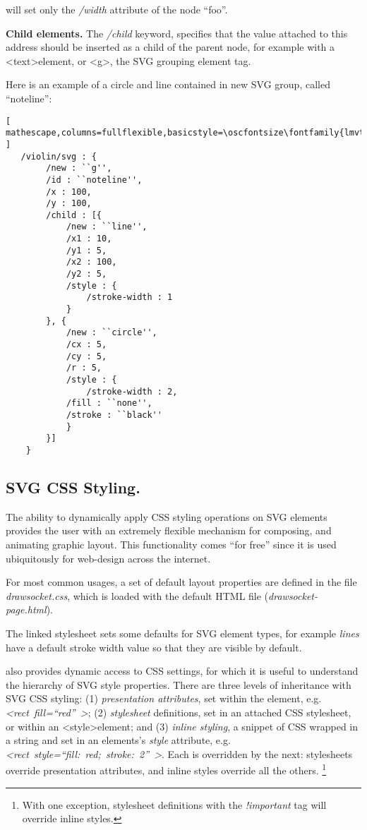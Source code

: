 \noindent
will set only the \textit{/width} attribute of the node ``foo''.

\medskip
\noindent
\textbf{Child elements.} 
The \textit{/child} keyword, specifies that the value attached to this address should be inserted as a child of the parent node, for example with a \textless text\textgreater element, or \textless g\textgreater, the SVG grouping element tag.

Here is an example of a circle and line contained in new SVG group, called ``noteline'':

\begin{lstlisting}[ mathescape,columns=fullflexible,basicstyle=\oscfontsize\fontfamily{lmvtt}\selectfont ]
   /violin/svg : {
        /new : ``g'',
        /id : ``noteline'',
        /x : 100,
        /y : 100,
    	/child : [{
      	    /new : ``line'',
      	    /x1 : 10,
      	    /y1 : 5,
      	    /x2 : 100,
      	    /y2 : 5,
      	    /style : {
      	        /stroke-width : 1
      	    }
      	}, {
      	    /new : ``circle'',
      	    /cx : 5,
      	    /cy : 5,
      	    /r : 5,
      	    /style : {
      	        /stroke-width : 2,
      		/fill : ``none'',
      		/stroke : ``black''
      	    }
        }]
    }
\end{lstlisting}


\subsection{SVG CSS Styling.} 
The ability to dynamically apply CSS styling operations on SVG elements provides the user with an extremely flexible mechanism for composing, and animating graphic layout.
This functionality comes ``for free'' since it is used ubiquitously for web-design across the internet.

For most common \drawsocket usages, a set of default layout properties are defined in the file \textit{drawsocket.css}, which is loaded with the default HTML file (\textit{drawsocket-page.html}).

The linked stylesheet sets some defaults for SVG element types, for example \textit{lines} have a default stroke width value so that they are visible by default.

\drawsocket also provides dynamic access to CSS settings, for which it is useful to understand the hierarchy of SVG style properties. There are three levels of inheritance with SVG CSS styling: (1) \textit{presentation attributes}, set within the element, e.g. \textit{\textless rect~fill=``red''~\textgreater}; 
(2) \textit{stylesheet} definitions, set in an attached CSS stylesheet, or within an \textless style\textgreater element;
and
(3) \textit{inline styling}, a snippet of CSS wrapped in a string and set in an elements's \textit{style} attribute, e.g. \textit{\textless rect~style=``fill:~red;~stroke:~2''~\textgreater}.
Each is overridden by the next: stylesheets override presentation attributes, and inline styles override all the others. \footnote{With one exception, stylesheet definitions with the \textit{!important} tag will override inline styles.} 

